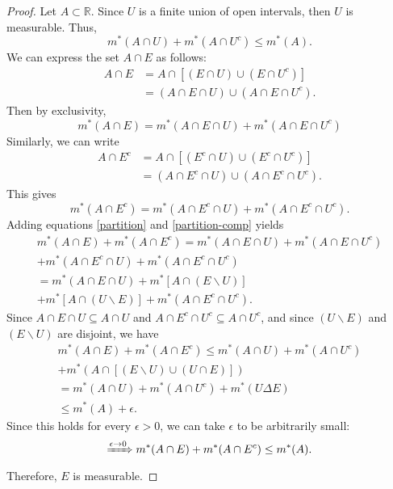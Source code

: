 \documentclass{article}
\begin{document}
\begin{proof}
	Let $A \subset \mathbb{R}$. Since $U$ is a finite union of open intervals, then $U$ is measurable. Thus,
	\begin{equation}\label{U-measurable}
		m^*(A \cap U) + m^*(A \cap U^c) \leq m^*(A).
	\end{equation}
	We can express the set $A \cap E$ as follows:
	\begin{align}
		A \cap E &= A \cap \left[\left(E\cap U\right)\cup\left(E\cap U^c\right)\right] \\
		&= (A\cap E \cap U) \cup (A \cap E \cap U^c).
	\end{align}
	Then by exclusivity,
	\begin{equation}\label{partition}
		m^*(A \cap E) = m^*(A\cap E\cap U) + m^*(A\cap E\cap U^c)
	\end{equation}
	Similarly, we can write
	\begin{align}
		A\cap E^c &= A\cap \left[(E^c \cap U)\cup(E^c \cap U^c)\right] \\
		&= (A\cap E^c\cap U) \cup (A\cap E^c \cap U^c).
	\end{align}
	This gives
	\begin{equation}\label{partition-comp}
		m^*(A \cap E^c) = m^*(A\cap E^c\cap U) + m^*(A\cap E^c\cap U^c).
	\end{equation}
	Adding equations \eqref{partition} and \eqref{partition-comp} yields
	\begin{align}
		m^*(A\cap E) + m^*(A\cap E^c) = m^*(A\cap E \cap U) + m^*(A\cap E\cap U^c) \nonumber \\+ m^*(A\cap E^c\cap U) + m^*(A\cap E^c\cap U^c) \\
		= m^*(A \cap E \cap U) + m^*\left[A\cap \left(E \backslash U\right)\right] \nonumber \\+ m^*\left[A\cap \left(U\backslash E\right)\right] + m^*(A\cap E^c \cap U^c).
	\end{align}
	Since $A\cap E \cap U \subseteq A\cap U$ and $A\cap E^c \cap U^c \subseteq A\cap U^c$, and since $(U \backslash E)$ and $(E \backslash U)$ are disjoint, we have 
	\begin{align}
		m^*(A\cap E) + m^*(A \cap E^c) \leq m^*(A\cap U) + m^*(A \cap U^c) \nonumber \\+ m^*\left(A \cap \left[(E\backslash U)\cup (U\cap E)\right]\right)\\
		= m^*(A\cap U) + m^*(A \cap U^c) + m^*(U \Delta E) \\
		\leq m^*(A) + \epsilon.
	\end{align}
	Since this holds for every $\epsilon > 0$, we can take $\epsilon$ to be arbitrarily small:
	\begin{equation}
		\xRightarrow{\epsilon \to 0} m^*(A\cap E) + m^*(A\cap E^c) \leq m^*(A).
	\end{equation}
	Therefore, $E$ is measurable.
\end{proof}
\end{document}
